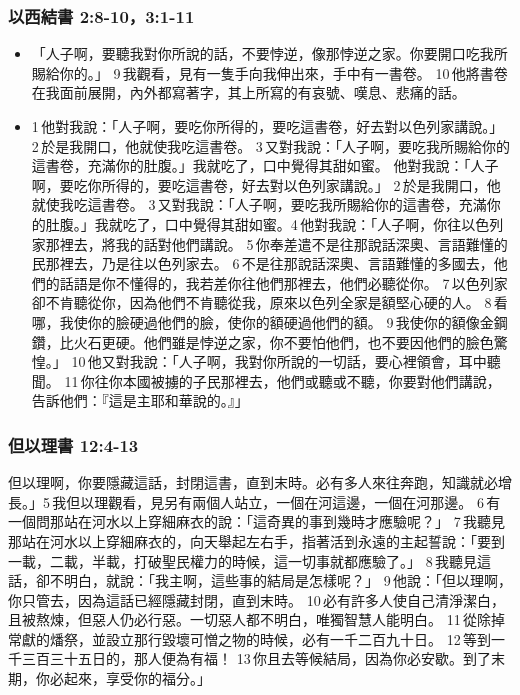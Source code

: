 \subsubsection{以西結書 2:8-10，3:1-11}
\begin{itemize}
\itemsep-.25em
\item 「人子啊，要聽我對你所說的話，不要悖逆，像那悖逆之家。你要開口吃我所賜給你的。」 9 我觀看，見有一隻手向我伸出來，手中有一書卷。 10 他將書卷在我面前展開，內外都寫著字，其上所寫的有哀號、嘆息、悲痛的話。
\item 1 他對我說：「人子啊，要吃你所得的，要吃這書卷，好去對以色列家講說。」 2 於是我開口，他就使我吃這書卷。 3 又對我說：「人子啊，要吃我所賜給你的這書卷，充滿你的肚腹。」我就吃了，口中覺得其甜如蜜。
他對我說：「人子啊，要吃你所得的，要吃這書卷，好去對以色列家講說。」 2 於是我開口，他就使我吃這書卷。 3 又對我說：「人子啊，要吃我所賜給你的這書卷，充滿你的肚腹。」我就吃了，口中覺得其甜如蜜。4 他對我說：「人子啊，你往以色列家那裡去，將我的話對他們講說。 5 你奉差遣不是往那說話深奧、言語難懂的民那裡去，乃是往以色列家去。 6 不是往那說話深奧、言語難懂的多國去，他們的話語是你不懂得的，我若差你往他們那裡去，他們必聽從你。 7 以色列家卻不肯聽從你，因為他們不肯聽從我，原來以色列全家是額堅心硬的人。 8 看哪，我使你的臉硬過他們的臉，使你的額硬過他們的額。 9 我使你的額像金鋼鑽，比火石更硬。他們雖是悖逆之家，你不要怕他們，也不要因他們的臉色驚惶。」 10 他又對我說：「人子啊，我對你所說的一切話，要心裡領會，耳中聽聞。 11 你往你本國被擄的子民那裡去，他們或聽或不聽，你要對他們講說，告訴他們：『這是主耶和華說的。』」
\end{itemize}

\subsubsection{但以理書 12:4-13}
但以理啊，你要隱藏這話，封閉這書，直到末時。必有多人來往奔跑，知識就必增長。」5 我但以理觀看，見另有兩個人站立，一個在河這邊，一個在河那邊。 6 有一個問那站在河水以上穿細麻衣的說：「這奇異的事到幾時才應驗呢？」 7 我聽見那站在河水以上穿細麻衣的，向天舉起左右手，指著活到永遠的主起誓說：「要到一載，二載，半載，打破聖民權力的時候，這一切事就都應驗了。」 8 我聽見這話，卻不明白，就說：「我主啊，這些事的結局是怎樣呢？」 9 他說：「但以理啊，你只管去，因為這話已經隱藏封閉，直到末時。 10 必有許多人使自己清淨潔白，且被熬煉，但惡人仍必行惡。一切惡人都不明白，唯獨智慧人能明白。 11 從除掉常獻的燔祭，並設立那行毀壞可憎之物的時候，必有一千二百九十日。 12 等到一千三百三十五日的，那人便為有福！ 13 你且去等候結局，因為你必安歇。到了末期，你必起來，享受你的福分。」


